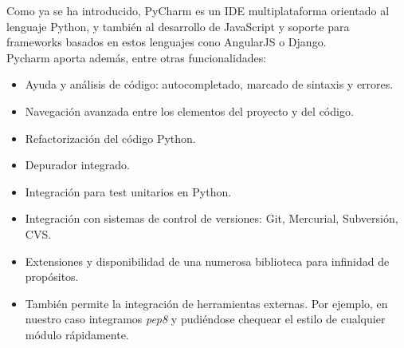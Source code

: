 Como ya se ha introducido, PyCharm es un IDE multiplataforma orientado al lenguaje Python, y también al desarrollo de JavaScript y soporte para frameworks basados en estos lenguajes cono AngularJS o Django.\\


Pycharm aporta además, entre otras funcionalidades:\\

\begin{itemize}
\item Ayuda y análisis de código: autocompletado, marcado de sintaxis y errores.\\

\item Navegación avanzada entre los elementos del proyecto y del código.\\

\item Refactorización del código Python.\\

\item Depurador integrado.

\item Integración para test unitarios en Python.\\

\item Integración con sistemas de control de versiones: Git, Mercurial, Subversión, CVS.\\

\item Extensiones y disponibilidad de una numerosa biblioteca para infinidad de propósitos.\\

\item También permite la integración de herramientas externas. Por ejemplo, en nuestro caso integramos \textit{pep8} y pudiéndose chequear el estilo de cualquier módulo rápidamente.
\end{itemize}


